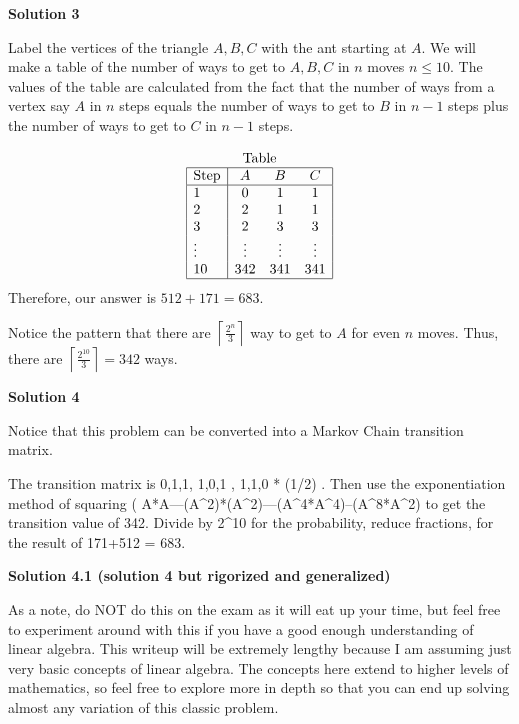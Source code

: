 \begin{enumerate}
 



\textbf{Solution 3}

Label the vertices of the triangle $A,B,C$ with the ant starting at $A$. We will make a table of the number of ways to get to $A,B,C$ in $n$ moves $n\leq10$. The values of the table are calculated from the fact that the number of ways from a vertex say $A$ in $n$ steps equals the number of ways to get to $B$ in $n-1$ steps plus the number of ways to get to $C$ in $n-1$ steps.

 


 

 \[\begin{array}{|l|ccc|} \multicolumn{4}{c}{\text{Table}}\\\hline \text{Step}&A&B&C \\\hline 1 &0 &1 &1 \\ 2 &2 &1 &1 \\ 3 &2 &3 &3\\ \vdots &\vdots&\vdots&\vdots \\ 10 &342 &341 &341 \\\hline \end{array}\]Therefore, our answer is $512+171=\boxed{683}.$

 


 Notice the pattern that there are $\left\lceil\frac{2^n}{3}\right\rceil$ way to get to $A$ for even $n$ moves. Thus, there are $\left\lceil\frac{2^{10}}{3}\right\rceil=342$ ways.

 



\textbf{Solution 4}

Notice that this problem can be converted into a Markov Chain transition matrix.

 The transition matrix is { {0,1,1}, {1,0,1} , {1,1,0} } * (1/2) . Then use the exponentiation method of squaring ( A*A---(A\textasciicircum{}2)*(A\textasciicircum{}2)---(A\textasciicircum{}4*A\textasciicircum{}4)--(A\textasciicircum{}8*A\textasciicircum{}2) to get the transition value of 342. Divide by 2\textasciicircum{}10 for the probability, reduce fractions, for the result of 171+512 = 683.

 



\textbf{Solution 4.1 (solution 4 but rigorized and generalized)}

As a note, do NOT do this on the exam as it will eat up your time, but feel free to experiment around with this if you have a good enough understanding of linear algebra. This writeup will be extremely lengthy because I am assuming just very basic concepts of linear algebra. The concepts here extend to higher levels of mathematics, so feel free to explore more in depth so that you can end up solving almost any variation of this classic problem.


\end{enumerate}

